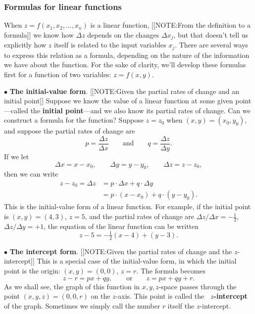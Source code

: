 \subsubsection{Formulas for linear functions}  
\label{subsubsec:formulas-for-linear-functions}

When $z = f(x_1, x_2, \ldots, x_n)$ is a linear function, 
[[NOTE:From the definition  to a formula]]	
we know how $\Delta z$ depends on the changes $\Delta x_j$, but that
doesn't tell us explicitly how $z$ itself is related to the input
variables $x_j$.  There are several ways to express this relation as a
formula, depending on the nature of
the information we have about the function.  For the sake of clarity,
we'll develop these formulas first for a function of two variables: $z
= f(x, y)$.

\noindent$\bullet$ {\bf The initial-value form}.
[[NOTE:Given the partial  rates of change and  an initial point]]
Suppose we know the value of a linear function at some given
point---called the {\bf initial point}---and we
also know its partial rates of change.  Can we construct a formula for
the function?  Suppose $z = z_0$ when $(x, y) = (x_0, y_0)$, and
suppose the partial rates of change are
\[
p = \dfrac{\Delta z}{\Delta x} \qquad \mbox{and} \qquad
		q = \dfrac{\Delta z}{\Delta y}.
\]
If we let
\[
\Delta x = x - x_0, \qquad \Delta y = y - y_0, \qquad \Delta z = z - z_0,
\]
then we can write
\begin{align*}
z - z_0 = \Delta z &= p \cdot \Delta x + q \cdot \Delta y \\
		   &= p \cdot (x - x_0) + q \cdot (y - y_0).
\end{align*}
This is the initial-value form of a linear function.  For example, if
the initial point is $(x, y) = (4, 3)$, $z = 5$, and the partial rates
of change are $\Delta z/\Delta x = -\tfrac{1}{2}$, $\Delta z/\Delta y
= +1$, the equation of the linear function can be written
\[
z - 5 = -\tfrac{1}{2} (x - 4) + (y - 3).
\]

\noindent$\bullet$ {\bf The intercept form}.
[[NOTE:Given the partial  rates of change and  the $z$-intercept]]
This is a special case of the initial-value form, in which the initial
point is the origin: $(x, y) = (0, 0)$, $z = r$.  The formula becomes
\[
z - r = p  x + q y, \qquad \mbox{or} \qquad
		z = p x + q  y + r.
\]
As we shall see, the graph of this function in $x, y, z$-space passes
through the point $(x, y, z) = (0, 0, r)$ on the $z$-axis.  This point
is called the \mbox{\bf{\boldmath
    $z$}-intercept} of the
graph.  Sometimes we simply call the number $r$ itself the
$z$-intercept.

